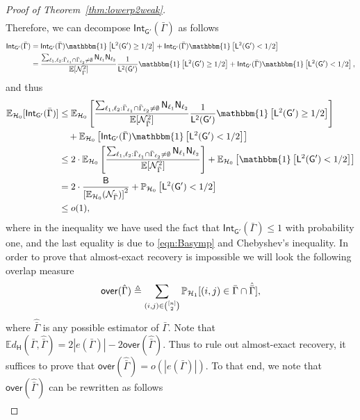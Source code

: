 \documentclass[12pt]{article}
\newcommand{\bE}{\mathbb{E}}
\newcommand{\Ind}{\mathbbm{1}}
\newcommand {\pr} {\mathbb{P}}
\newcommand{\calH}{{\cal H}}
\newcommand{\calN}{{\cal N}}
\newcommand{\pp}[1]{\left[#1\right]}
\newcommand{\s}[1]{\mathsf{#1}}
\begin{document}
\begin{proof}[Proof of Theorem~\ref{thm:lowerp2weak}]
\begin{align}
\end{align}
Therefore, we can decompose $\s{Int}_{\s{G}'}(\bar\Gamma)$ as follows
\begin{align}
\s{Int}_{\s{G}'}(\bar\Gamma) &= \s{Int}_{\s{G}'}(\bar\Gamma)\Ind\pp{\s{L}^2(\s{G}')\geq1/2}+ \s{Int}_{\s{G}'}(\bar\Gamma)\Ind\pp{\s{L}^2(\s{G}')<1/2}\\
& = \frac{\sum_{\ell_1,\ell_2:\bar{\Gamma}_{\ell_1}\cap\bar{\Gamma}_{\ell_2}\neq\emptyset}\s{N}_{\ell_1}\s{N}_{\ell_2}}{\bE[\calN^2_{\bar\Gamma}]}\frac{1}{\s{L^2(\s{G}')}}\Ind\pp{\s{L}^2(\s{G}')\geq1/2}+ \s{Int}_{\s{G}'}(\bar\Gamma)\Ind\pp{\s{L}^2(\s{G}')<1/2},
\end{align}
and thus
\begin{align}
\bE_{\calH_0}[\s{Int}_{\s{G}'}(\bar\Gamma)]&\leq \bE_{\calH_0}\pp{\frac{\sum_{\ell_1,\ell_2:\bar{\Gamma}_{\ell_1}\cap\bar{\Gamma}_{\ell_2}\neq\emptyset}\s{N}_{\ell_1}\s{N}_{\ell_2}}{\bE[\calN^2_{\bar\Gamma}]}\frac{1}{\s{L^2(\s{G}')}}\Ind\pp{\s{L}^2(\s{G}')\geq1/2}}\nonumber\\
&\quad+\bE_{\calH_0}\pp{\s{Int}_{\s{G}'}(\bar\Gamma)\Ind\pp{\s{L}^2(\s{G}')<1/2}}\\
&\leq 2\cdot\bE_{\calH_0}\pp{\frac{\sum_{\ell_1,\ell_2:\bar{\Gamma}_{\ell_1}\cap\bar{\Gamma}_{\ell_2}\neq\emptyset}\s{N}_{\ell_1}\s{N}_{\ell_2}}{\bE[\calN^2_{\bar\Gamma}]}}+\bE_{\calH_0}\pp{\Ind\pp{\s{L}^2(\s{G}')<1/2}}\\
&= 2\cdot \frac{\s{B}}{\pp{\bE_{\calH_0}(\calN_{\bar\Gamma})}^2}+\pr_{\calH_0}\pp{\s{L}^2(\s{G}')<1/2}\\
& \leq o(1),\label{eqn:ExpectedOverlap}
\end{align}
where in the inequality we have used the fact that $\s{Int}_{\s{G}'}(\bar\Gamma)\leq1$ with probability one, and the last equality is due to \eqref{eqn:Basymp} and Chebyshev's inequality. In order to prove that almost-exact recovery is impossible we will look the following overlap measure
\begin{align}
\s{over}(\hat{\Gamma})\triangleq \sum_{(i,j)\in\binom{[n]}{2}}\pr_{\calH_1}[(i,j)\in\bar\Gamma\cap\hat{\bar\Gamma}],
\end{align}
where $\hat{\bar\Gamma}$ is any possible estimator of $\bar\Gamma$. Note that $\bE d_{\s{H}}(\bar\Gamma,\hat{\bar\Gamma}) = 2|e(\bar\Gamma)|-2\s{over}(\hat{\bar\Gamma})$. Thus to rule out almost-exact recovery, it suffices to prove that $\s{over}(\hat{\bar\Gamma})=o(|e(\bar\Gamma)|)$. To that end, we note that $\s{over}(\hat{\bar\Gamma})$ can be rewritten as follows
\begin{align}

\end{align}
\end{proof}
\end{document}
